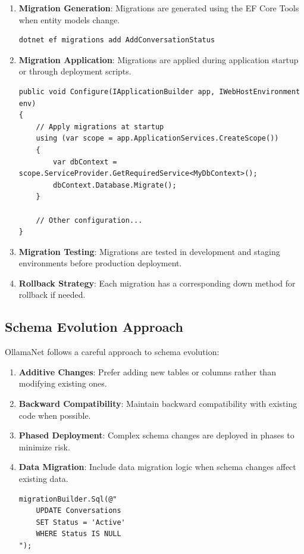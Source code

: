 \begin{enumerate}
   \item \textbf{Migration Generation}: Migrations are generated using the EF Core Tools when entity models change.

\begin{verbatim}
dotnet ef migrations add AddConversationStatus
\end{verbatim}

   \item \textbf{Migration Application}: Migrations are applied during application startup or through deployment scripts.

\begin{verbatim}
public void Configure(IApplicationBuilder app, IWebHostEnvironment env)
{
    // Apply migrations at startup
    using (var scope = app.ApplicationServices.CreateScope())
    {
        var dbContext = scope.ServiceProvider.GetRequiredService<MyDbContext>();
        dbContext.Database.Migrate();
    }
    
    // Other configuration...
}
\end{verbatim}

   \item \textbf{Migration Testing}: Migrations are tested in development and staging environments before production deployment.

   \item \textbf{Rollback Strategy}: Each migration has a corresponding down method for rollback if needed.
\end{enumerate}

\subsection{Schema Evolution Approach}

OllamaNet follows a careful approach to schema evolution:

\begin{enumerate}
   \item \textbf{Additive Changes}: Prefer adding new tables or columns rather than modifying existing ones.

   \item \textbf{Backward Compatibility}: Maintain backward compatibility with existing code when possible.

   \item \textbf{Phased Deployment}: Complex schema changes are deployed in phases to minimize risk.

   \item \textbf{Data Migration}: Include data migration logic when schema changes affect existing data.

\begin{verbatim}
migrationBuilder.Sql(@"
    UPDATE Conversations
    SET Status = 'Active'
    WHERE Status IS NULL
");
\end{verbatim}
\end{enumerate}

